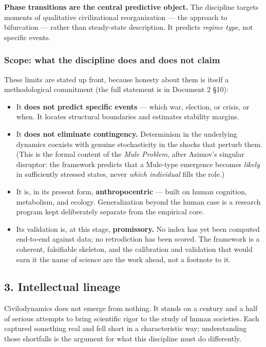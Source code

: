 \documentclass[
]{article}
\providecommand{\tightlist}{%
  \setlength{\itemsep}{0pt}\setlength{\parskip}{0pt}}
\begin{document}
\textbf{Phase transitions are the central predictive object.} The
discipline targets moments of qualitative civilizational reorganization
--- the approach to bifurcation --- rather than steady-state
description. It predicts \emph{regime type}, not specific events.

\subsubsection{Scope: what the discipline does and does not
claim}\label{scope-what-the-discipline-does-and-does-not-claim}

These limits are stated up front, because honesty about them is itself a
methodological commitment (the full statement is in Document 2 §10):

\begin{itemize}
\tightlist
\item
  It \textbf{does not predict specific events} --- which war, election,
  or crisis, or when. It locates structural boundaries and estimates
  stability margins.
\item
  It \textbf{does not eliminate contingency.} Determinism in the
  underlying dynamics coexists with genuine stochasticity in the shocks
  that perturb them. (This is the formal content of the \emph{Mule
  Problem}, after Asimov's singular disruptor: the framework predicts
  that a Mule-type emergence becomes \emph{likely} in sufficiently
  stressed states, never \emph{which individual} fills the role.)
\item
  It is, in its present form, \textbf{anthropocentric} --- built on
  human cognition, metabolism, and ecology. Generalization beyond the
  human case is a research program kept deliberately separate from the
  empirical core.
\item
  Its validation is, at this stage, \textbf{promissory.} No index has
  yet been computed end-to-end against data; no retrodiction has been
  scored. The framework is a coherent, falsifiable skeleton, and the
  calibration and validation that would earn it the name of science are
  the work ahead, not a footnote to it.
\end{itemize}

\subsection{3. Intellectual lineage}\label{intellectual-lineage}

Civilodynamics does not emerge from nothing. It stands on a century and
a half of serious attempts to bring scientific rigor to the study of
human societies. Each captured something real and fell short in a
characteristic way; understanding those shortfalls is the argument for
what this discipline must do differently.
\end{document}
